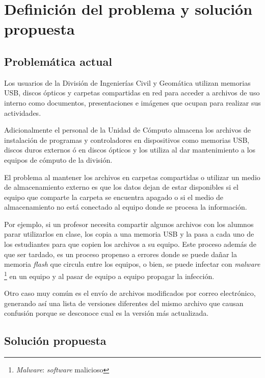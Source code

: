 {
  \linespread{1}
  \cleardoublepage  
  \chapter{Definici\'{o}n del problema y soluci\'{o}n propuesta}
  \label{chap:cap2}
}

    \section {Problem\'{a}tica actual}

Los usuarios de la Divisi\'{o}n de Ingenier\'{i}as Civil y Geom\'{a}tica utilizan memorias \textsc{USB}, discos \'{o}pticos y carpetas compartidas en red para acceder a archivos de uso interno como documentos, presentaciones e im\'{a}genes que ocupan para realizar sus actividades.

Adicionalmente el personal de la Unidad de C\'{o}mputo almacena los archivos de instalaci\'{o}n de programas y controladores en dispositivos como memorias \textsc{USB}, discos duros externos \'{o} en discos \'{o}pticos y los utiliza al dar mantenimiento a los equipos de c\'{o}mputo de la divisi\'{o}n.

El problema al mantener los archivos en carpetas compartidas o utilizar un medio de almacenamiento externo es que los datos dejan de estar disponibles si el equipo que comparte la carpeta se encuentra apagado o si el medio de almacenamiento no est\'{a} conectado al equipo donde se procesa la informaci\'{o}n.

Por ejemplo, si un profesor necesita compartir algunos archivos con los alumnos parar utilizarlos en clase, los copia a una memoria \textsc{USB} y la pasa a cada uno de los estudiantes para que copien los archivos a su equipo. Este proceso adem\'{a}s de que ser tardado, es un proceso propenso a errores donde se puede da\~{n}ar la memoria \textit{flash} que circula entre los equipos, o bien, se puede infectar con \textit{malware} \footnote{\textit{Malware}: \textit{software} malicioso} en un equipo y al pasar de equipo a equipo propagar la infecci\'{o}n.

Otro caso muy com\'{u}n es el env\'{i}o de archivos modificados por correo electr\'{o}nico, generando as\'{i} una lista de versiones diferentes del mismo archivo que causan confusi\'{o}n porque se desconoce cual es la versi\'{o}n m\'{a}s actualizada.

    \section {Soluci\'{o}n propuesta}

